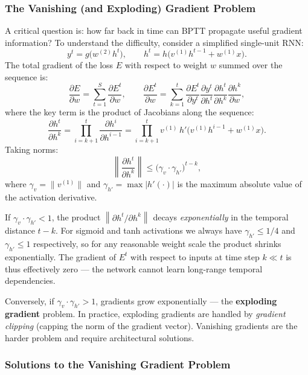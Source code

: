 \documentclass[11pt,a4paper]{article}
\newcommand{\term}[1]{\textcolor{DefGreen}{\textbf{#1}}\index{#1}}
\begin{document}
\subsubsection{The Vanishing (and Exploding) Gradient Problem}
\label{sec:vanishing_gradient}

A critical question is: how far back in time can BPTT propagate useful gradient information? To understand the difficulty, consider a simplified single-unit RNN:
\[
  y^t = g\!\bigl(w^{(2)} h^t\bigr), \qquad h^t = h\!\bigl(v^{(1)} h^{t-1} + w^{(1)} x\bigr).
\]
The total gradient of the loss $E$ with respect to weight $w$ summed over the sequence is:
\[
  \frac{\partial E}{\partial w} = \sum_{t=1}^{S}\frac{\partial E^t}{\partial w}, \qquad
  \frac{\partial E^t}{\partial w} = \sum_{k=1}^{t}\frac{\partial E^t}{\partial y^t}\frac{\partial y^t}{\partial h^t}\frac{\partial h^t}{\partial h^k}\frac{\partial h^k}{\partial w},
\]
where the key term is the product of Jacobians along the sequence:
\[
  \frac{\partial h^t}{\partial h^k} = \prod_{i=k+1}^{t}\frac{\partial h^i}{\partial h^{i-1}} = \prod_{i=k+1}^{t} v^{(1)}\, h'\!\bigl(v^{(1)} h^{i-1} + w^{(1)} x\bigr).
\]
Taking norms:
\[
  \left\|\frac{\partial h^t}{\partial h^k}\right\| \leq \bigl(\gamma_v \cdot \gamma_{h'}\bigr)^{t-k},
\]
where $\gamma_v = \|v^{(1)}\|$ and $\gamma_{h'} = \max |h'(\cdot)|$ is the maximum absolute value of the activation derivative.

\begin{warnbox}
If $\gamma_v \cdot \gamma_{h'} < 1$, the product $\left\|\partial h^t/\partial h^k\right\|$ decays \emph{exponentially} in the temporal distance $t - k$. For sigmoid and tanh activations we always have $\gamma_{h'} \leq 1/4$ and $\gamma_{h'} \leq 1$ respectively, so for any reasonable weight scale the product shrinks exponentially. The gradient of $E^t$ with respect to inputs at time step $k \ll t$ is thus effectively zero — the network cannot learn long-range temporal dependencies.

Conversely, if $\gamma_v \cdot \gamma_{h'} > 1$, gradients grow exponentially — the \term{exploding gradient} problem. In practice, exploding gradients are handled by \emph{gradient clipping} (capping the norm of the gradient vector). Vanishing gradients are the harder problem and require architectural solutions.
\end{warnbox}

\subsubsection{Solutions to the Vanishing Gradient Problem}
\end{document}
